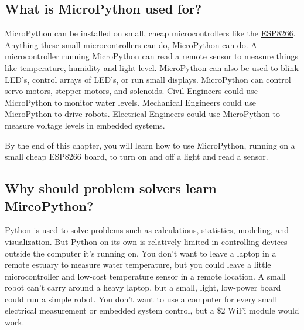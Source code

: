 \documentclass{book}
\begin{document}
    
        \subsection{What is MicroPython used
for?}\label{what-is-micropython-used-for}
    




    
        MicroPython can be installed on small, cheap microcontrollers like the
\href{https://learn.adafruit.com/adafruit-feather-huzzah-esp8266}{ESP8266}.
Anything these small microcontrollers can do, MicroPython can do. A
microcontroller running MicroPython can read a remote sensor to measure
things like temperature, humidity and light level. MicroPython can also
be used to blink LED's, control arrays of LED's, or run small displays.
MicroPython can control servo motors, stepper motors, and solenoids.
Civil Engineers could use MicroPython to monitor water levels.
Mechanical Engineers could use MicroPython to drive robots. Electrical
Engineers could use MicroPython to measure voltage levels in embedded
systems.

By the end of this chapter, you will learn how to use MicroPython,
running on a small cheap ESP8266 board, to turn on and off a light and
read a sensor.
    




    
        \subsection{Why should problem solvers learn
MircoPython?}\label{why-should-problem-solvers-learn-mircopython}
    




    
        Python is used to solve problems such as calculations, statistics,
modeling, and visualization. But Python on its own is relatively limited
in controlling devices outside the computer it's running on. You don't
want to leave a laptop in a remote estuary to measure water temperature,
but you could leave a little microcontroller and low-cost temperature
sensor in a remote location. A small robot can't carry around a heavy
laptop, but a small, light, low-power board could run a simple robot.
You don't want to use a computer for every small electrical measurement
or embedded system control, but a \$2 WiFi module would work.
\end{document}
